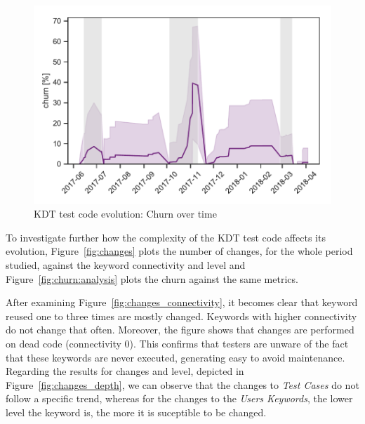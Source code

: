\begin{figure}
\centering
\includegraphics[width=0.7\columnwidth]{figures/evolution/time_series_churn.pdf}
\caption{KDT test code evolution: Churn over time}  
\label{fig:churn}
\end{figure}

To investigate further how the complexity of the KDT test code affects its evolution, Figure~\ref{fig:changes} plots the number of changes, for the whole period studied, against the keyword connectivity and level and Figure~\ref{fig:churn:analysis} plots the churn against the same metrics.

After examining Figure~\ref{fig:changes_connectivity}, it becomes clear that keyword reused one to three times are mostly changed. Keywords with higher connectivity do not change that often. Moreover, the figure shows that changes are performed on dead code (connectivity 0). This confirms that testers are unware of the fact that these keywords are never executed, generating easy to avoid maintenance. Regarding the results for changes and level, depicted in Figure~\ref{fig:changes_depth}, we can observe that the changes to \emph{Test Cases} do not follow a specific trend, whereas for the changes to the \emph{Users Keywords}, the lower level the keyword is, the more it is suceptible to be changed.

